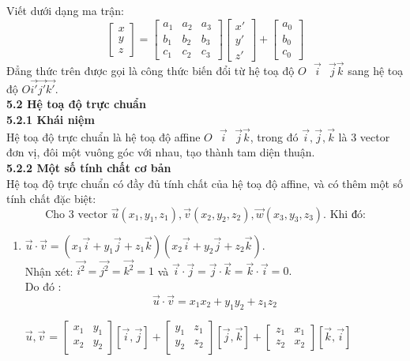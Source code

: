 \documentclass[12pt,a4]{article}
\begin{document}
\begin{titlepage}
\[\]
Viết dưới dạng ma trận:
\[
\begin{bmatrix}x\\y\\z\end{bmatrix} = \begin{bmatrix}a_1 & a_2&a_3\\b_1 & b_2&b_3\\c_1 & c_2&c_3\end{bmatrix} \begin{bmatrix}x'\\y'\\z'\end{bmatrix} + \begin{bmatrix}a_0\\b_0\\c_0\end{bmatrix}
\]
Đẳng thức trên được gọi là công thức biến đổi từ hệ toạ độ $O\textbf{ }\vec{i}\textbf{ }\vec{j}\vec{k}$ sang hệ toạ độ $O\vec{i'}\vec{j'}\vec{k'}$.\\
\vspace{0.2cm}
\textbf{5.2 Hệ toạ độ trực chuẩn}\\
\vspace{0.2cm}
\textbf{5.2.1 Khái niệm}\\
Hệ toạ độ trực chuẩn là hệ toạ độ affine $O\textbf{ }\vec{i}\textbf{ }\vec{j}\vec{k}$, trong đó $\vec{i},\vec{j},\vec{k}$ là 3 vector đơn vị, đôi một vuông góc với nhau, tạo thành tam diện thuận.\\
\vspace{0.2cm}
\textbf{5.2.2 Một số tính chất cơ bản}\\
\vspace{0.2cm}
Hệ toạ độ trực chuẩn có đầy đủ tính chất của hệ toạ độ affine, và có thêm một số tính chất đặc biệt:
\[
\text{Cho 3 vector } \vec{u}(x_1,y_1,z_1), \vec{v}(x_2,y_2,z_2), \vec{w}(x_3,y_3,z_3). \text{ Khi đó:}
\]
\begin{enumerate}
\item $\vec{u}\cdot\vec{v} = (x_1 \vec{i} + y_1\vec{j} + z_1\vec{k})(x_2\vec{i} + y_2\vec{j} + z_2\vec{k}).$\\
Nhận xét: $\vec{i^2} = \vec{j^2} = \vec{k^2} = 1$ và $\vec{i}\cdot\vec{j} = \vec{j}\cdot\vec{k} = \vec{k}\cdot\vec{i} = 0.$\\
Do đó :
\[
\vec{u} \cdot \vec{v} = x_1x_2 + y_1y_2 + z_1z_2
\]
\item [$\vec{u},\vec{v}$] = $\begin{bmatrix}x_1 &y_1 \\ x_2& y_2\end{bmatrix}[\vec{i},\vec{j}] + \begin{bmatrix}y_1 &z_1 \\ y_2&z_2\end{bmatrix}[\vec{j},\vec{k}] + \begin{bmatrix}z_1 &x_1 \\ z_2& x_2\end{bmatrix}[\vec{k},\vec{i}]$\\

\end{enumerate}
\end{titlepage}
\end{document}
